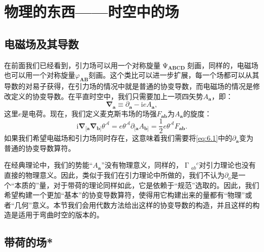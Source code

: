 \chapter{物理的东西——时空中的场}


\section{电磁场及其导数}

在前面我们已经看到，引力场可以用一个对称旋量$\upPsi _{\boldsymbol{ABCD}}$刻画，同样的，电磁场也可以用一个对称旋量$\varphi _{\boldsymbol{AB}}$刻画。这个类比可以进一步扩展，每一个场都可以从其导数的对易子获得，在引力场的情况中就是普通的协变导数，而电磁场的情况是修改定义的协变导数。在平直时空中，我们只需要加上一项四矢势$A_{\boldsymbol{a}}$，即：
\begin{equation}
	\boldsymbol{\nabla }_{\boldsymbol{a}} \equiv \partial _{\boldsymbol{a}} -\mathrm{i} eA_{\boldsymbol{a}} ,
	\label{eq:6.1}
\end{equation}
这里$e$是电荷。现在，我们定义麦克斯韦场的场强$F_{\boldsymbol{ab}}$为$A_{\boldsymbol{a}}$的旋度：
\begin{equation*}
	\mathrm{i}\boldsymbol{\nabla }_{[\boldsymbol{a}}\boldsymbol{\nabla }_{\boldsymbol{b}]} \theta ^{\mathcal{A}} =e\theta ^{\mathcal{A}} \partial _{[\boldsymbol{a}} A_{\boldsymbol{b}]} =\frac{1}{2} e\theta ^{\mathcal{A}} F_{\boldsymbol{ab}} .
\end{equation*}
如果我们希望电磁场和引力场同时存在，这意味着我们需要将\ref{eq:6.1}中的$\partial _{\boldsymbol{a}}$变为普通的协变导数算符。 \ 



在经典理论中，我们的势能“$A_{\boldsymbol{a}}$”没有物理意义，同样的，$\upGamma {_{ab}}^{c}$对引力理论也没有直接的物理意义。因此，类似于我们在引力理论中所做的，我们不认为$\partial _{a}$是一个“本质的”量，对于带荷的理论同样如此，它是依赖于“规范”选取的。因此，我们希望构建一个更加“基本”的协变导数算符，使得用它构建出来的量都有“物理”或者“几何”意义。本节我们会用代数方法给出这样的协变导数的构造，并且这样的构造是适用于弯曲时空的版本的。


\section{带荷的场*}

